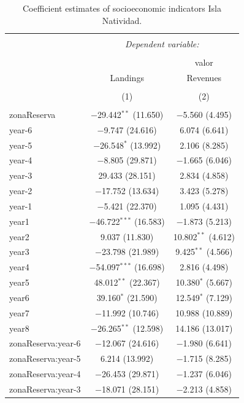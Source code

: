\documentclass[]{article}
\begin{document}
\begin{table}[!htbp] \centering 
  \caption{Coefficient estimates of socioeconomic indicators Isla Natividad.} 
  \label{} 
\tiny 
\begin{tabular}{@{\extracolsep{1pt}}lcc} 
\\[-1.8ex]\hline 
\hline \\[-1.8ex] 
 & \multicolumn{2}{c}{\textit{Dependent variable:}} \\ 
\cline{2-3} 
\\[-1.8ex] &  & valor \\ 
 & Landings & Revenues \\ 
\\[-1.8ex] & (1) & (2)\\ 
\hline \\[-1.8ex] 
 zonaReserva & $-$29.442$^{**}$ (11.650) & $-$5.560 (4.495) \\ 
  year-6 & $-$9.747 (24.616) & 6.074 (6.641) \\ 
  year-5 & $-$26.548$^{*}$ (13.992) & 2.106 (8.285) \\ 
  year-4 & $-$8.805 (29.871) & $-$1.665 (6.046) \\ 
  year-3 & 29.433 (28.151) & 2.834 (4.858) \\ 
  year-2 & $-$17.752 (13.634) & 3.423 (5.278) \\ 
  year-1 & $-$5.421 (22.370) & 1.095 (4.431) \\ 
  year1 & $-$46.722$^{***}$ (16.583) & $-$1.873 (5.213) \\ 
  year2 & 9.037 (11.830) & 10.802$^{**}$ (4.612) \\ 
  year3 & $-$23.798 (21.989) & 9.425$^{**}$ (4.566) \\ 
  year4 & $-$54.097$^{***}$ (16.698) & 2.816 (4.498) \\ 
  year5 & 48.012$^{**}$ (22.367) & 10.380$^{*}$ (5.667) \\ 
  year6 & 39.160$^{*}$ (21.590) & 12.549$^{*}$ (7.129) \\ 
  year7 & $-$11.992 (10.746) & 10.988 (10.889) \\ 
  year8 & $-$26.265$^{**}$ (12.598) & 14.186 (13.017) \\ 
  zonaReserva:year-6 & $-$12.067 (24.616) & $-$1.980 (6.641) \\ 
  zonaReserva:year-5 & 6.214 (13.992) & $-$1.715 (8.285) \\ 
  zonaReserva:year-4 & $-$26.453 (29.871) & $-$1.237 (6.046) \\ 
  zonaReserva:year-3 & $-$18.071 (28.151) & $-$2.213 (4.858) \\ 

\end{tabular}
\end{table}
\end{document}
